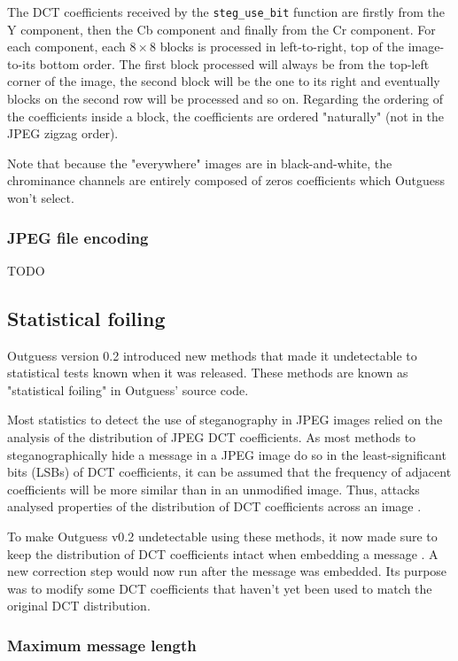 \documentclass{article}
\begin{document}
The DCT coefficients received by the \texttt{steg\_use\_bit} function are firstly from the Y component, then the Cb component and finally from the Cr component. For each component, each $8 \times 8$ blocks is processed in left-to-right, top of the image-to-its bottom order. The first block processed will always be from the top-left corner of the image, the second block will be the one to its right and eventually blocks on the second row will be processed and so on. Regarding the ordering of the coefficients inside a block, the coefficients are ordered "naturally" (not in the JPEG zigzag order).

Note that because the "everywhere" images are in black-and-white, the chrominance channels are entirely composed of zeros coefficients which Outguess won't select.

\subsubsection{JPEG file encoding}

{\color{red} TODO}

\subsection{Statistical foiling}

Outguess version 0.2 introduced new methods that made it undetectable to statistical tests known when it was released\cite{def01}. These methods are known as "statistical foiling" in Outguess' source code. 

Most statistics to detect the use of steganography in JPEG images relied on the analysis of the distribution of JPEG DCT coefficients. As most methods to steganographically hide a message in a JPEG image do so in the least-significant bits (LSBs) of DCT coefficients, it can be assumed that the frequency of adjacent coefficients will be more similar than in an unmodified image. Thus, attacks analysed properties of the distribution of DCT coefficients across an image \cite{det01}.

To make Outguess v0.2 undetectable using these methods, it now made sure to keep the distribution of DCT coefficients intact when embedding a message \cite{def01}. A new correction step would now run after the message was embedded. Its purpose was to modify some DCT coefficients that haven't yet been used to match the original DCT distribution.

\subsubsection{Maximum message length}
\end{document}
